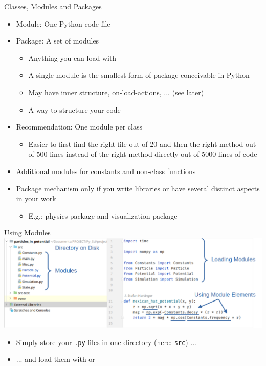 \begin{frame}{Classes, Modules and Packages}
%
\begin{itemize}
\item Module: One Python code file
\item Package: A set of modules
	\begin{itemize}
	\item Anything you can load with 
	\item A single module is the smallest form of package conceivable in Python
	\item May have inner structure, on-load-actions, ... (see later)
	\item[\Thus] A way to structure your code
	\end{itemize}
\item Recommendation: One module per class
	\begin{itemize}
	\item Easier to first find the right file out of 20 and then the right method out of 500 lines instead of the right method directly out of 5000 lines of code
	\end{itemize}
\item Additional modules for constants and non-class functions
\item Package mechanism only if you write libraries or have several distinct aspects in your work
	\begin{itemize}
	\item E.\;g.: physics package and visualization package
	\end{itemize}
\end{itemize}
%
\end{frame}


\begin{frame}{Using Modules}
%
\includegraphics[width=\linewidth]{./gfx/01-modules}
%
\begin{itemize}
\item Simply store your \texttt{.py} files in one directory (here: \texttt{src}) ...
\item ... and load them with  or 
\end{itemize}
%
\end{frame}


